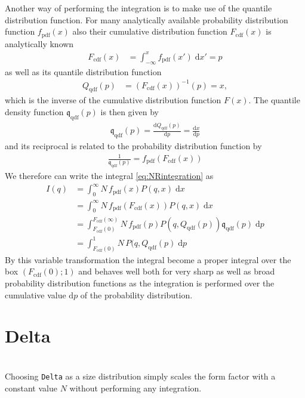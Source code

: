 Another way of performing the integration is to make use of the quantile distribution function. For many analytically available  probability distribution function $f_\mathrm{pdf}(x)$ also their cumulative distribution function $F_\mathrm{cdf}(x)$ is analytically known
\begin{align}
F_\mathrm{cdf}(x)&=\int_{-\infty}^x f_\mathrm{pdf}(x') \;\mathrm{d}x'=p
\end{align}
as well as its quantile distribution function
\begin{align}
Q_\mathrm{qdf}(p)&=(F_\mathrm{cdf}(x))^{-1}(p)=x,
\end{align}
which is the inverse of the cumulative distribution function $F(x)$.
The quantile density function $\mathfrak{q}_\mathrm{qdf}(p)$ is then given by
\begin{align}
\mathfrak{q}_\mathrm{qdf}(p)=\frac{\mathrm{d}Q_\mathrm{qdf}(p)}{\mathrm{d}p}=\frac{\mathrm{d}x}{\mathrm{d}p}
\end{align}
and its reciprocal is related to the probability distribution function by
\begin{align}
\frac{1}{\mathfrak{q}_\mathrm{qdf}(p)}=f_\mathrm{pdf}(F_\mathrm{cdf}(x))
\end{align}
 We therefore can write the integral \ref{eq:NRintegration} as
\begin{align}
I(q) &= \int_0^\infty N\, f_\mathrm{pdf}(x) P(q,x) \; \mathrm{d}x \\
     &= \int_{0}^{\infty} N\, f_\mathrm{pdf}(F_\mathrm{cdf}(x)) P(q,x) \; \mathrm{d}x \\
     &= \int_{F_\mathrm{cdf}(0)}^{F_\mathrm{cdf}(\infty)} N\, f_\mathrm{pdf}(p) P(q,Q_\mathrm{qdf}(p)) \mathfrak{q}_\mathrm{qdf}(p) \; \mathrm{d}p \\
     &= \int_{F_\mathrm{cdf}(0)}^{1} N\, P(q,Q_\mathrm{qdf}(p) \; \mathrm{d}p
\end{align}
By this variable transformation the integral become a proper integral over the box $(F_\mathrm{cdf}(0);1)$ and behaves well both for very sharp as well as broad probability distribution functions as the integration is performed over the cumulative value $\mathrm{d}p$ of the probability distribution.

\clearpage
\section{Delta} \hspace{1pt} \\
\label{sec:Delta}
Choosing \texttt{Delta} as a size distribution simply scales the form factor with a constant value $N$ without performing any integration.

